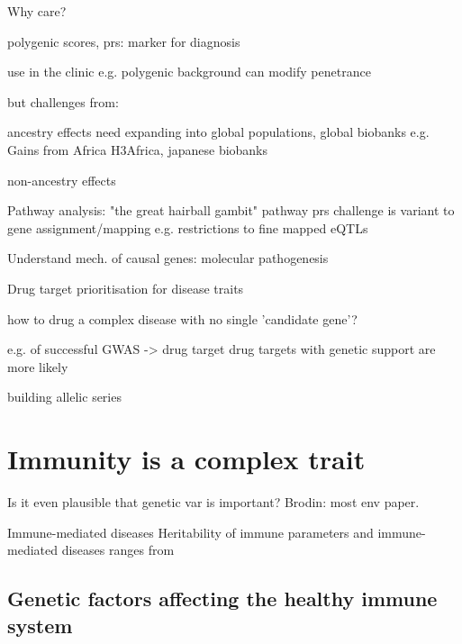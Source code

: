 \begin{outline}

\1 Why care?

    \2 polygenic scores, prs: marker for diagnosis

        \3 use in the clinic
            \4 e.g. polygenic background can modify penetrance 

        \3 but challenges from:

            \4 ancestry effects
            \4 need expanding into global populations, global biobanks e.g. Gains from Africa H3Africa, japanese biobanks

            \4 non-ancestry effects

    \2 Pathway analysis: "the great hairball gambit"
    \2 pathway prs
        \3 challenge is variant to gene assignment/mapping
            \4 e.g. restrictions to fine mapped eQTLs

    \2 Understand mech. of causal genes: molecular pathogenesis

    \2 Drug target prioritisation for disease traits

    \2 how to drug a complex disease with no single 'candidate gene'?

        \3 e.g. of successful GWAS -> drug target
            \4 drug targets with genetic support are more likely

        \3 building allelic series

\end{outline}

\section{Immunity is a complex trait}

Is it even plausible that genetic var is important?
Brodin: most env paper.

Immune-mediated diseases
Heritability of immune parameters and immune-mediated diseases
    ranges from 

\subsection{Genetic factors affecting the healthy immune system}

